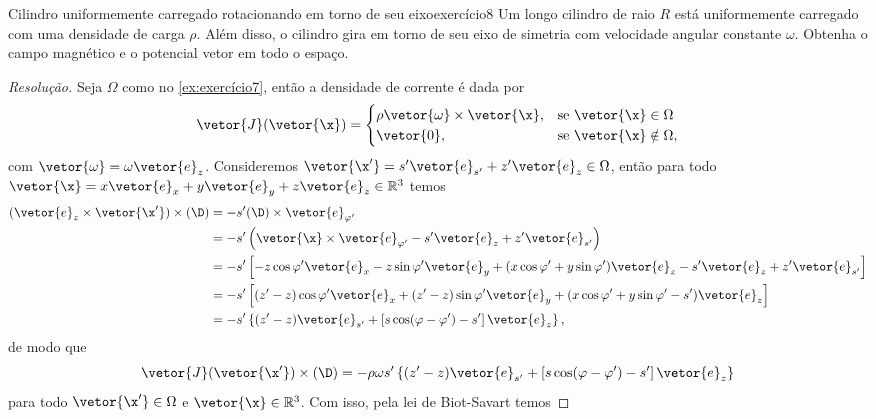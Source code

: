 \begin{exercício}{Cilindro uniformemente carregado rotacionando em torno de seu eixo}{exercício8}
    Um longo cilindro de raio \(R\) está uniformemente carregado com uma densidade de carga \(\rho\). Além disso, o cilindro gira em torno de seu eixo de simetria com velocidade angular constante \(\omega\). Obtenha o campo magnético e o potencial vetor em todo o espaço.
\end{exercício}
\begin{proof}[Resolução]
    Seja \(\Omega\) como no \cref{ex:exercício7}, então a densidade de corrente é dada por
    \begin{equation*}
        \vetor{J}(\vetor{\x}) = \begin{cases}
            \rho \vetor{\omega}\times \vetor{\x},&\text{se }\vetor{\x}\in \Omega\\
            \vetor{0},&\text{se }\vetor{\x}\notin \Omega,
        \end{cases}
    \end{equation*}
    com \(\vetor{\omega} = \omega \vetor{e}_z\). Consideremos \(\vetor{\x'} = s' \vetor{e}_{s'} + z' \vetor{e}_z \in \Omega\), então para todo \(\vetor{\x} = x \vetor{e}_x + y\vetor{e}_y + z \vetor{e}_z\in \mathbb{R}^3\) temos
    \begin{align*}
        (\vetor{e}_z\times \vetor{\x'}) \times (\D)
        &= -s'(\D)\times\vetor{e}_{\varphi'}\\
        &=   -s' \left(\vetor{\x} \times\vetor{e}_{\varphi'} -   s' \vetor{e}_z + z' \vetor{e}_{s'}\right)\\
        &=   -s' \left[-z\cos\varphi'\vetor{e}_x - z\sin\varphi'\vetor{e}_y + (x\cos\varphi' + y \sin\varphi')\vetor{e}_z - s'\vetor{e}_z + z' \vetor{e}_{s'}\right]\\
        &=   -s' \left[(z'-z)\cos\varphi'\vetor{e}_x+(z'- z)\sin\varphi'\vetor{e}_y + (x\cos\varphi' + y \sin\varphi' - s')\vetor{e}_z\right]\\
        &= -s' \left\{(z' - z) \vetor{e}_{s'} + \left[s \cos(\varphi - \varphi') - s'\right]\vetor{e}_z\right\},
    \end{align*}
    de modo que
    \begin{equation*}
        \vetor{J}(\vetor{\x'}) \times (\D) = -\rho\omega s' \left\{(z' - z) \vetor{e}_{s'} + \left[s \cos(\varphi - \varphi') - s'\right]\vetor{e}_z\right\}
    \end{equation*}
    para todo \(\vetor{\x'} \in \Omega\) e \(\vetor{\x} \in \mathbb{R}^3\). Com isso, pela lei de Biot-Savart temos

\end{proof}

